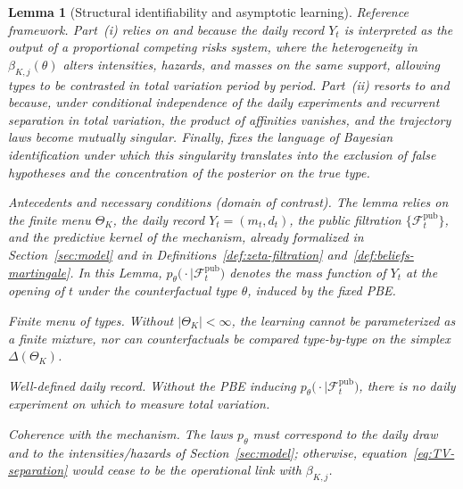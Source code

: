 \documentclass[pdflatex,sn-mathphys-ay]{sn-jnl}
\theoremstyle{plain}
\newtheorem{lemma}[theorem]{Lemma}
\theoremstyle{definition}
\newcommand{\ThetaK}{\Theta_K}
\newcommand{\1}{\mathbf{1}}
\begin{document}
\begin{lemma}[Structural identifiability and asymptotic learning]\label{lem:hazard-separation}
\normalfont
Reference framework. Part~\textup{(i)} relies on \citet{Cox1972} and \citet{Bradburn2003} because the daily record $Y_t$ is interpreted as the output of a proportional competing risks system, where the heterogeneity in $\beta_{K,j}(\theta)$ alters intensities, hazards, and masses on the same support, allowing types to be contrasted in total variation period by period. Part~\textup{(ii)} resorts to \citet{Kakutani1948} and \citet{Shiryaev2019Probability} because, under conditional independence of the daily experiments and recurrent separation in total variation, the product of affinities vanishes, and the trajectory laws become mutually singular. Finally, \citet{Schervish1995Theory} fixes the language of Bayesian identification under which this singularity translates into the exclusion of false hypotheses and the concentration of the posterior on the true type.

\medskip
\noindent Antecedents and necessary conditions \textup{(}domain of contrast\textup{)}.
The lemma relies on the finite menu $\ThetaK$, the daily record $Y_t=(m_t,d_t)$, the public filtration $\{\mathcal{F}_t^{\mathrm{pub}}\}$, and the predictive kernel of the mechanism, already formalized in Section~\ref{sec:model} and in Definitions~\ref{def:zeta-filtration} and~\ref{def:beliefs-martingale}. In this Lemma, $p_\theta\bigl(\cdot\mid \mathcal{F}_t^{\mathrm{pub}}\bigr)$ denotes the mass function of $Y_t$ at the opening of $t$ under the counterfactual type $\theta$, induced by the fixed PBE.
\begin{list}{}{%
  \setlength{\leftmargin}{2.25em}%
  \setlength{\labelwidth}{2.25em}%
  \setlength{\labelsep}{0.45em}%
  \setlength{\itemsep}{0.35em}%
  \setlength{\parsep}{0pt}%
  \setlength{\topsep}{0.25em}%
}
\item[\textup{(N1)}] \textup{Finite menu of types.}\quad
Without $\lvert\ThetaK\rvert<\infty$, the learning cannot be parameterized as a finite mixture, nor can counterfactuals be compared type-by-type on the simplex $\Delta(\ThetaK)$.
\item[\textup{(N2)}] \textup{Well-defined daily record.}\quad
Without the PBE inducing $p_\theta\bigl(\cdot\mid\mathcal{F}_t^{\mathrm{pub}}\bigr)$, there is no daily experiment on which to measure total variation.
\item[\textup{(N3)}] \textup{Coherence with the mechanism.}\quad
The laws $p_\theta$ must correspond to the daily draw and to the intensities/hazards of Section~\ref{sec:model}; otherwise, equation~\eqref{eq:TV-separation} would cease to be the operational link with $\beta_{K,j}$.
\end{list}


\end{lemma}
\end{document}
